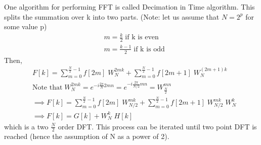 \documentclass[11pt]{article}
\begin{document}
            One algorithm for performing FFT is called Decimation in Time algorithm. This splits the summation over k into two parts. (Note: let us assume that $N=2^p$ for some value p)
            \begin{align*}
               &m = \frac{k}{2} \; \textrm{if k is even} \\
               &m = \frac{k-1}{2} \; \textrm{if k is odd}
            \end{align*}
            Then,
            \begin{align*}
               &F[k] = \sum_{m=0}^{\frac{N}{2} - 1} f[2m]\; W_N^{2mk} + \sum_{m=0}^{\frac{N}{2} - 1} f[2m+1]\; W_N^{(2m+1)k}\\
               &\textrm{Note that} \; W_N^{2mk} =  e^{-i\frac{2\pi}{N} 2mn} = e^{-i\frac{2\pi}{N/2} mn} = W_{\frac{N}{2}}^{mn}\\
               &\implies F[k] = \sum_{m=0}^{\frac{N}{2} - 1} f[2m]\; W_{N/2}^{mk} + \sum_{m=0}^{\frac{N}{2} - 1} f[2m+1]\; W_{N/2}^{mk}\; W_{N}^{k}\\
               &\implies F[k] = G[k] + W_N^k \; H[k]
            \end{align*}
            which is a two $\frac{N}{2}$ order DFT. This process can be iterated until two point DFT is reached (hence the assumption of N as a power of 2).
\end{document}
